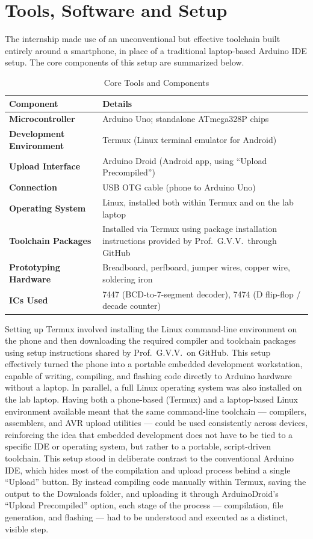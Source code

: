 \documentclass[12pt,a4paper]{report}
\begin{document}
\chapter{Tools, Software and Setup}
\label{ch:tools}
The internship made use of an unconventional but effective toolchain built entirely around a smartphone, in place of a traditional laptop-based Arduino IDE setup. The core components of this setup are summarized below.
\begin{table}[H]
\centering
\caption{Core Tools and Components}
\label{tab:tools}
\begin{tabular}{@{}>{\bfseries}p{3.6cm}p{10.5cm}@{}}
\toprule
Component & \textbf{Details} \\
\midrule
Microcontroller & Arduino Uno; standalone ATmega328P chips \\
Development Environment & Termux (Linux terminal emulator for Android) \\
Upload Interface & Arduino Droid (Android app, using ``Upload Precompiled'') \\
Connection & USB OTG cable (phone to Arduino Uno) \\
Operating System & Linux, installed both within Termux and on the lab laptop \\
Toolchain Packages & Installed via Termux using package installation instructions provided by Prof.\ G.V.V.\ through GitHub \\
Prototyping Hardware & Breadboard, perfboard, jumper wires, copper wire, soldering iron \\
ICs Used & 7447 (BCD-to-7-segment decoder), 7474 (D flip-flop / decade counter) \\
\bottomrule
\end{tabular}
\end{table}
Setting up Termux involved installing the Linux command-line environment on the phone and then downloading the required compiler and toolchain packages using setup instructions shared by Prof.\ G.V.V.\ on GitHub. This setup effectively turned the phone into a portable embedded development workstation, capable of writing, compiling, and flashing code directly to Arduino hardware without a laptop.
In parallel, a full Linux operating system was also installed on the lab laptop. Having both a phone-based (Termux) and a laptop-based Linux environment available meant that the same command-line toolchain --- compilers, assemblers, and AVR upload utilities --- could be used consistently across devices, reinforcing the idea that embedded development does not have to be tied to a specific IDE or operating system, but rather to a portable, script-driven toolchain.
This setup stood in deliberate contrast to the conventional Arduino IDE, which hides most of the compilation and upload process behind a single ``Upload'' button. By instead compiling code manually within Termux, saving the output to the Downloads folder, and uploading it through ArduinoDroid's ``Upload Precompiled'' option, each stage of the process --- compilation, file generation, and flashing --- had to be understood and executed as a distinct, visible step.
\end{document}
